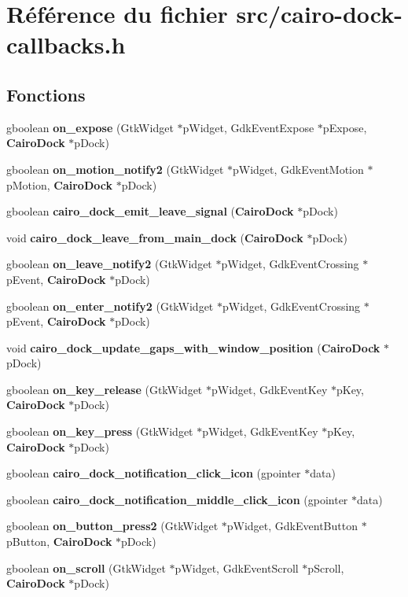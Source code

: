\section{Référence du fichier src/cairo-dock-callbacks.h}
\label{cairo-dock-callbacks_8h}
\subsection*{Fonctions}
\begin{CompactItemize}
\item 
gboolean {\bf on\_\-expose} (GtkWidget $\ast$pWidget, GdkEventExpose $\ast$pExpose, {\bf CairoDock} $\ast$pDock)
\item 
gboolean {\bf on\_\-motion\_\-notify2} (GtkWidget $\ast$pWidget, GdkEventMotion $\ast$pMotion, {\bf CairoDock} $\ast$pDock)
\item 
gboolean {\bf cairo\_\-dock\_\-emit\_\-leave\_\-signal} ({\bf CairoDock} $\ast$pDock)
\item 
void {\bf cairo\_\-dock\_\-leave\_\-from\_\-main\_\-dock} ({\bf CairoDock} $\ast$pDock)
\item 
gboolean {\bf on\_\-leave\_\-notify2} (GtkWidget $\ast$pWidget, GdkEventCrossing $\ast$pEvent, {\bf CairoDock} $\ast$pDock)
\item 
gboolean {\bf on\_\-enter\_\-notify2} (GtkWidget $\ast$pWidget, GdkEventCrossing $\ast$pEvent, {\bf CairoDock} $\ast$pDock)
\item 
void {\bf cairo\_\-dock\_\-update\_\-gaps\_\-with\_\-window\_\-position} ({\bf CairoDock} $\ast$pDock)
\item 
gboolean {\bf on\_\-key\_\-release} (GtkWidget $\ast$pWidget, GdkEventKey $\ast$pKey, {\bf CairoDock} $\ast$pDock)
\item 
gboolean {\bf on\_\-key\_\-press} (GtkWidget $\ast$pWidget, GdkEventKey $\ast$pKey, {\bf CairoDock} $\ast$pDock)
\item 
gboolean {\bf cairo\_\-dock\_\-notification\_\-click\_\-icon} (gpointer $\ast$data)
\item 
gboolean {\bf cairo\_\-dock\_\-notification\_\-middle\_\-click\_\-icon} (gpointer $\ast$data)
\item 
gboolean {\bf on\_\-button\_\-press2} (GtkWidget $\ast$pWidget, GdkEventButton $\ast$pButton, {\bf CairoDock} $\ast$pDock)
\item 
gboolean {\bf on\_\-scroll} (GtkWidget $\ast$pWidget, GdkEventScroll $\ast$pScroll, {\bf CairoDock} $\ast$pDock)
\item 

\end{CompactItemize}
